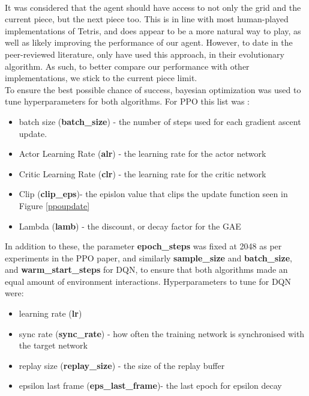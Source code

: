 \documentclass[12pt]{article}
\begin{document}
\\\newline
It was considered that the agent should have access to not only the grid and the current piece, but the next piece too. This is in line with most human-played implementations of Tetris, and does appear to be a more natural way to play, as well as likely improving the performance of our agent. However, to date in the peer-reviewed literature, only \textcite{bohm2005evolutionary} have used this approach, in their evolutionary algorithm. As such, to better compare our performance with other implementations, we stick to the current piece limit. \\\newline
To ensure the best possible chance of success, bayesian optimization \autocite{MockusJonas1989Batg} was used to tune hyperparameters for both algorithms. For PPO this list was :
\begin{itemize}
    \item batch size (\textbf{batch\_size}) - the number of steps used for each gradient ascent update. 
    \item Actor Learning Rate (\textbf{alr}) - the learning rate for the actor network
    \item Critic Learning Rate (\textbf{clr}) - the learning rate for the critic network
    \item Clip (\textbf{clip\_eps})- the epislon value that clips the update function seen in Figure \ref{ppoupdate}
    \item Lambda (\textbf{lamb}) - the discount, or decay factor for the GAE
\end{itemize}
In addition to these, the parameter \textbf{epoch\_steps} was fixed at 2048 as per experiments in the PPO paper, and similarly \textbf{sample\_size} and \textbf{batch\_size}, and \textbf{warm\_start\_steps} for DQN, to ensure that both algorithms made an equal amount of environment interactions. Hyperparameters to tune for DQN were: 
\begin{itemize}
    \item learning rate (\textbf{lr})
    \item sync rate (\textbf{sync\_rate}) - how often the training network is synchronised with the target network 
    \item replay size (\textbf{replay\_size}) - the size of the replay buffer 
    \item epsilon last frame (\textbf{eps\_last\_frame})- the last epoch for epsilon decay 
\end{itemize}
\end{document}
